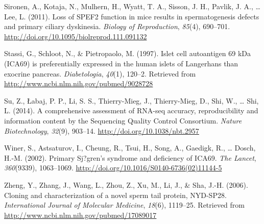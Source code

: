 \documentclass[12pt,twoside]{reedthesis}
\theoremstyle{definition}
\theoremstyle{definition}
\theoremstyle{remark}
\begin{document}
  \hypertarget{ref-Sironen2011}{}
  Sironen, A., Kotaja, N., Mulhern, H., Wyatt, T. A., Sisson, J. H.,
  Pavlik, J. A., \ldots{} Lee, L. (2011). Loss of SPEF2 function in mice
  results in spermatogenesis defects and primary ciliary dyskinesia.
  \emph{Biology of Reproduction}, \emph{85}(4), 690--701.
  \url{http://doi.org/10.1095/biolreprod.111.091132}
  
  \hypertarget{ref-Stassi1997}{}
  Stassi, G., Schloot, N., \& Pietropaolo, M. (1997). Islet cell
  autoantigen 69 kDa (ICA69) is preferentially expressed in the human
  islets of Langerhans than exocrine pancreas. \emph{Diabetologia},
  \emph{40}(1), 120--2. Retrieved from
  \url{http://www.ncbi.nlm.nih.gov/pubmed/9028728}
  
  \hypertarget{ref-Su2014}{}
  Su, Z., Łabaj, P. P., Li, S. S., Thierry-Mieg, J., Thierry-Mieg, D.,
  Shi, W., \ldots{} Shi, L. (2014). A comprehensive assessment of RNA-seq
  accuracy, reproducibility and information content by the Sequencing
  Quality Control Consortium. \emph{Nature Biotechnology}, \emph{32}(9),
  903--14. \url{http://doi.org/10.1038/nbt.2957}
  
  \hypertarget{ref-Winer2002}{}
  Winer, S., Astsaturov, I., Cheung, R., Tsui, H., Song, A., Gaedigk, R.,
  \ldots{} Dosch, H.-M. (2002). Primary Sj?gren's syndrome and deficiency
  of ICA69. \emph{The Lancet}, \emph{360}(9339), 1063--1069.
  \url{http://doi.org/10.1016/S0140-6736(02)11144-5}
  
  \hypertarget{ref-Zheng2006}{}
  Zheng, Y., Zhang, J., Wang, L., Zhou, Z., Xu, M., Li, J., \& Sha, J.-H.
  (2006). Cloning and characterization of a novel sperm tail protein,
  NYD-SP28. \emph{International Journal of Molecular Medicine},
  \emph{18}(6), 1119--25. Retrieved from
  \url{http://www.ncbi.nlm.nih.gov/pubmed/17089017}


\end{document}
